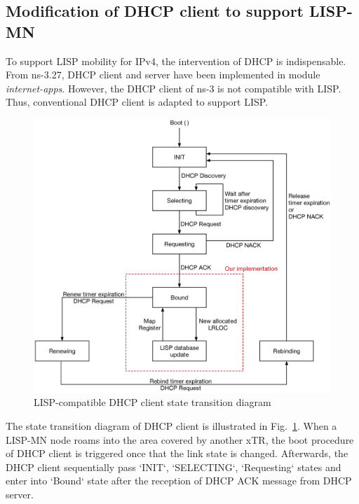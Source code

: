 \subsection{Modification of DHCP client to support LISP-MN}
\label{subsec:DHCP}
To support LISP mobility for IPv4, the intervention of DHCP is indispensable. From ns-3.27, DHCP client and server have been implemented in module \emph{internet-apps}. However, the DHCP client of ns-3 is not compatible with LISP. Thus, conventional DHCP client is adapted to support LISP.
\begin{figure}[!t]
	\centering
	\includegraphics[width=\textwidth]{Pics/DHCP_transition_state.eps}
	\caption{LISP-compatible DHCP client state transition diagram}
	\label{fig:DHCP-state-transition}
\end{figure}
The state transition diagram of DHCP client is illustrated in Fig.~\ref{fig:DHCP-state-transition}. When a LISP-MN node roams into the area covered by another xTR, the boot procedure of DHCP client is triggered once that the link state is changed. Afterwards, the DHCP client sequentially pass `INIT`, `SELECTING`, `Requesting` states and enter into `Bound` state after the reception of DHCP ACK message from DHCP server.
